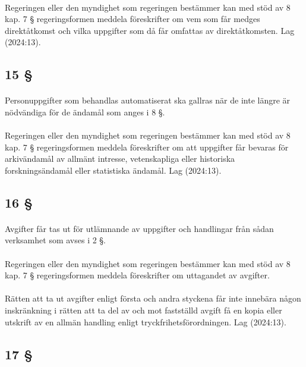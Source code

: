 \documentclass[a4paper,notitlepage,openany,10pt]{book}
\begin{document}
\paragraph*{}
Regeringen eller den myndighet som regeringen bestämmer kan med stöd av 8 kap. 7 § regeringsformen meddela föreskrifter om vem som får medges direktåtkomst och vilka uppgifter som då får omfattas av direktåtkomsten.
Lag (2024:13).
\subsection*{15 §}
\paragraph*{}
Personuppgifter som behandlas automatiserat ska gallras när de inte längre är nödvändiga för de ändamål som anges i 8 §.
\paragraph*{}
Regeringen eller den myndighet som regeringen bestämmer kan med stöd av 8 kap. 7 § regeringsformen meddela föreskrifter om att uppgifter får bevaras för arkivändamål av allmänt intresse, vetenskapliga eller historiska forskningsändamål eller statistiska ändamål.
Lag (2024:13).
\subsection*{16 §}
\paragraph*{}
Avgifter får tas ut för utlämnande av uppgifter och handlingar från sådan verksamhet som avses i 2 §.
\paragraph*{}
Regeringen eller den myndighet som regeringen bestämmer kan med stöd av 8 kap. 7 § regeringsformen meddela föreskrifter om uttagandet av avgifter.
\paragraph*{}
Rätten att ta ut avgifter enligt första och andra styckena får inte innebära någon inskränkning i rätten att ta del av och mot fastställd avgift få en kopia eller utskrift av en allmän handling enligt tryckfrihetsförordningen.
Lag (2024:13).
\subsection*{17 §}
\end{document}

